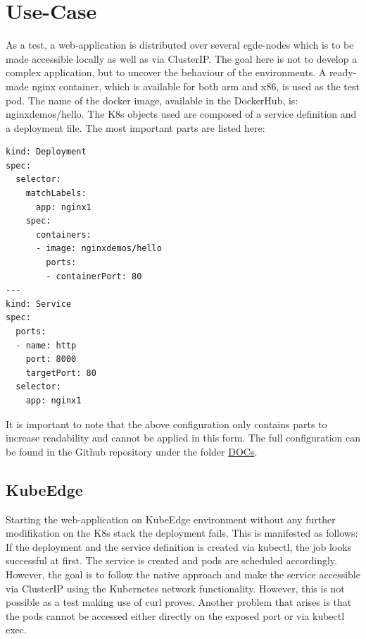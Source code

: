 \documentclass[MSC,Master,english]{twbook}%
\begin{document}
\section{Use-Case}
\label{sec:dsrusecase}
\label{sec:dsrusecaseweb}
As a test, a web-application is distributed over several egde-nodes which is to be made accessible locally as well as via ClusterIP. The goal here is not to develop a complex application, but to uncover the behaviour of the environments. A ready-made nginx container, which is available for both arm and x86, is used as the test pod. The name of the docker image, available in the DockerHub, is: nginxdemos/hello. The \ac{K8s} objects used are composed of a service definition and a deployment file. The most important parts are listed here:

\vspace{\baselineskip}
\begin{lstlisting}[caption={Web-application code},captionpos=b]
kind: Deployment
spec:
  selector:
    matchLabels:
      app: nginx1
    spec:
      containers:
      - image: nginxdemos/hello
        ports:
        - containerPort: 80
---
kind: Service
spec:
  ports:
  - name: http
    port: 8000
    targetPort: 80
  selector:
    app: nginx1
\end{lstlisting}

It is important to note that the above configuration only contains parts to increase readability and cannot be applied in this form. The full configuration can be found in the Github repository under the folder \hyperref{https://github.com/Berndinox/K8sEdge/blob/main/DOCs/}{}{}{DOCs}\cite{bk-gh-docs}.

\subsection{KubeEdge} 
\label{sec:ke-usecase}
Starting the web-application on KubeEdge environment without any further modifikation on the \ac{K8s} stack the deployment fails. This is manifested as follows: If the deployment and the service definition is created via kubectl, the job looks successful at first. The service is created and pods are scheduled accordingly. However, the goal is to follow the native approach and make the service accessible via ClusterIP using the Kubernetes network functionality. However, this is not possible as a test making use of curl proves. Another problem that arises is that the pods cannot be accessed either directly on the exposed port or via kubectl exec.
\end{document}
